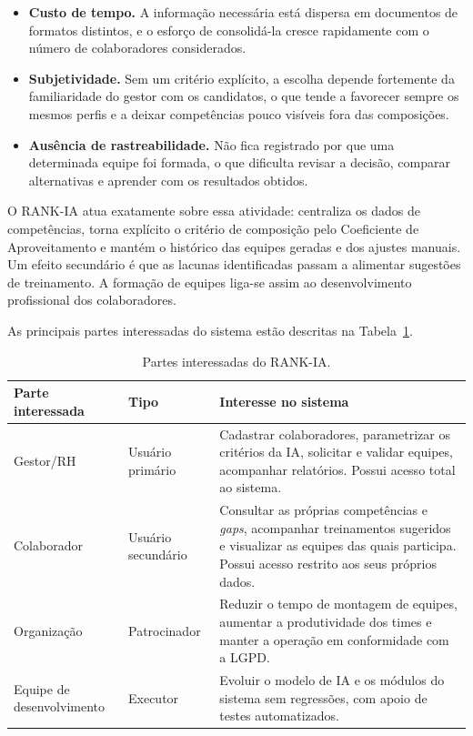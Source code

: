 \documentclass[a4paper,12pt,oneside,openany]{book}
\begin{document}
\begin{itemize}[nosep]
    \item \textbf{Custo de tempo.} A informação necessária está dispersa em
    documentos de formatos distintos, e o esforço de consolidá-la cresce
    rapidamente com o número de colaboradores considerados.
    \item \textbf{Subjetividade.} Sem um critério explícito, a escolha depende
    fortemente da familiaridade do gestor com os candidatos, o que tende a
    favorecer sempre os mesmos perfis e a deixar competências pouco visíveis fora
    das composições.
    \item \textbf{Ausência de rastreabilidade.} Não fica registrado por que uma
    determinada equipe foi formada, o que dificulta revisar a decisão, comparar
    alternativas e aprender com os resultados obtidos.
\end{itemize}

O RANK-IA atua exatamente sobre essa atividade: centraliza os dados de
competências, torna explícito o critério de composição pelo Coeficiente de
Aproveitamento e mantém o histórico das equipes geradas e dos ajustes manuais.
Um efeito secundário é que as lacunas identificadas passam a alimentar
sugestões de treinamento. A formação de equipes liga-se assim ao
desenvolvimento profissional dos colaboradores.

As principais partes interessadas do sistema estão descritas na
Tabela~\ref{tab:stakeholders}.

\begin{table}[H]
\centering
\caption{Partes interessadas do RANK-IA.}
\label{tab:stakeholders}
\begin{tabularx}{0.95\textwidth}{p{} p{} X}
\toprule
\textbf{Parte interessada} & \textbf{Tipo} & \textbf{Interesse no sistema} \\
\midrule
Gestor/RH & Usuário primário & Cadastrar colaboradores, parametrizar os
critérios da IA, solicitar e validar equipes, acompanhar relatórios. Possui
acesso total ao sistema. \\
Colaborador & Usuário secundário & Consultar as próprias competências e
\textit{gaps}, acompanhar treinamentos sugeridos e visualizar as equipes das
quais participa. Possui acesso restrito aos seus próprios dados. \\
Organização & Patrocinador & Reduzir o tempo de montagem de equipes, aumentar a
produtividade dos times e manter a operação em conformidade com a LGPD. \\
Equipe de desenvolvimento & Executor & Evoluir o modelo de IA e os módulos do
sistema sem regressões, com apoio de testes automatizados. \\
\bottomrule
\end{tabularx}
\end{table}
\end{document}
